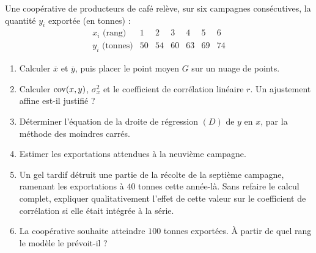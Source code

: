 \begin{jecherche}
Une coopérative de producteurs de café relève, sur six campagnes
consécutives, la quantité $y_{i}$ exportée (en tonnes) :
\[
  \begin{array}{c|cccccc}
    x_{i} \text{ (rang)} & 1 & 2 & 3 & 4 & 5 & 6 \\
    \hline
    y_{i} \text{ (tonnes)} & 50 & 54 & 60 & 63 & 69 & 74
  \end{array}
\]

\begin{enumerate}[label=\textbf{\arabic*.}, leftmargin=*, itemsep=0.3em]
  \item Calculer $\overline{x}$ et $\overline{y}$, puis placer le point
        moyen $G$ sur un nuage de points.
  \item Calculer $\operatorname{cov}(x,y)$, $\sigma_{x}^{2}$ et le coefficient de
        corrélation linéaire $r$. Un ajustement affine est-il justifié ?
  \item Déterminer l'équation de la droite de régression $(D)$ de $y$ en
        $x$, par la méthode des moindres carrés.
  \item Estimer les exportations attendues à la neuvième campagne.
  \item Un gel tardif détruit une partie de la récolte de la septième
        campagne, ramenant les exportations à $40$ tonnes cette année-là.
        Sans refaire le calcul complet, expliquer qualitativement l'effet de
        cette valeur sur le coefficient de corrélation si elle était
        intégrée à la série.
  \item La coopérative souhaite atteindre $100$ tonnes exportées. À partir de
        quel rang le modèle le prévoit-il ?
\end{enumerate}
\end{jecherche}

